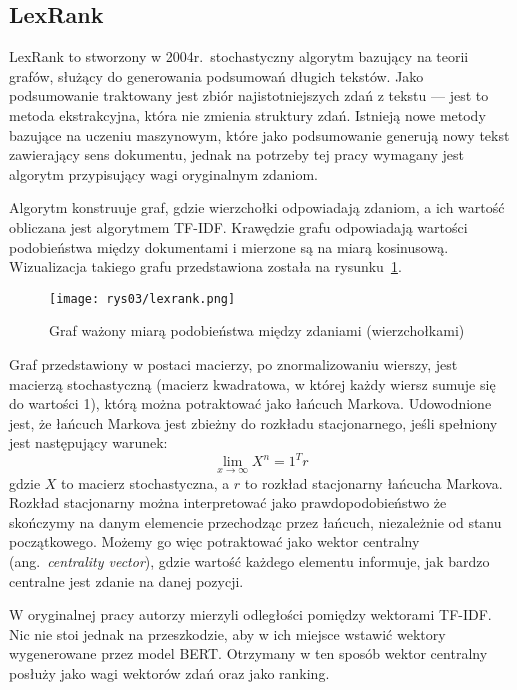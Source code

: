 	\subsection{LexRank}
		LexRank\cite{LexRank} to stworzony w 2004r.\ stochastyczny algorytm bazujący na teorii grafów, służący do generowania podsumowań długich tekstów.
		Jako podsumowanie traktowany jest zbiór najistotniejszych zdań z tekstu --- jest to metoda ekstrakcyjna, która nie zmienia struktury zdań.
		Istnieją nowe metody bazujące na uczeniu maszynowym, które jako podsumowanie generują nowy tekst zawierający sens dokumentu,
			jednak na potrzeby tej pracy wymagany jest algorytm przypisujący wagi oryginalnym zdaniom.
		
		Algorytm konstruuje graf, gdzie wierzchołki odpowiadają zdaniom, a ich wartość obliczana jest algorytmem TF-IDF\@.
		Krawędzie grafu odpowiadają wartości podobieństwa między dokumentami i mierzone są na miarą kosinusową.
		Wizualizacja takiego grafu przedstawiona została na rysunku~\ref{fig:lexrank}.
		\begin{figure}[ht]
			\centering
			\texttt{[image: rys03/lexrank.png]}
			\caption{Graf ważony miarą podobieństwa między zdaniami (wierzchołkami)\cite{LexRank}}\label{fig:lexrank}
		\end{figure}
		Graf przedstawiony w postaci macierzy, po znormalizowaniu wierszy, jest macierzą stochastyczną
			(macierz kwadratowa, w której każdy wiersz sumuje się do wartości 1), którą można potraktować jako łańcuch Markova.
		Udowodnione jest, że łańcuch Markova jest zbieżny do rozkładu stacjonarnego, jeśli spełniony jest następujący warunek:
		\[\lim_{x \to \infty}X^n = 1^T r\]
		gdzie \(X\) to macierz stochastyczna, a \(r\) to rozkład stacjonarny łańcucha Markova.
		Rozkład stacjonarny można interpretować jako prawdopodobieństwo że skończymy na danym elemencie przechodząc przez łańcuch, niezależnie od stanu początkowego.
		Możemy go więc potraktować jako wektor centralny (ang.\ \emph{centrality vector}),
			gdzie wartość każdego elementu informuje, jak bardzo centralne jest zdanie na danej pozycji.

		W oryginalnej pracy autorzy mierzyli odległości pomiędzy wektorami TF-IDF\@.
		Nic nie stoi jednak na przeszkodzie, aby w ich miejsce wstawić wektory wygenerowane przez model BERT\@.
		Otrzymany w ten sposób wektor centralny posłuży jako wagi wektorów zdań oraz jako ranking.

